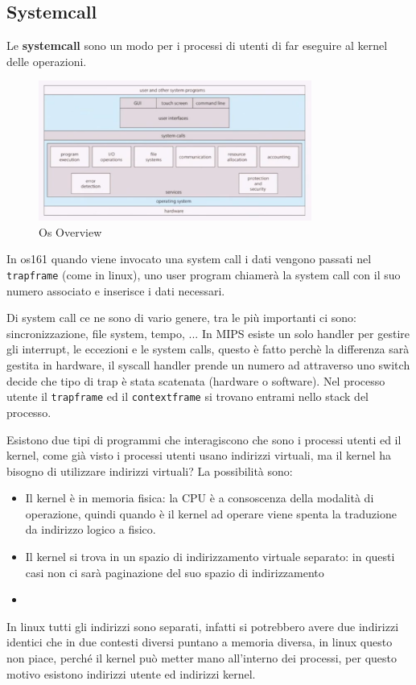 \documentclass[12pt]{article}
\begin{document}
\subsection{Systemcall}
Le \textbf{systemcall} sono un modo per i processi di utenti di far eseguire al kernel delle operazioni.
\begin{figure}[H]
  \centering
  \includegraphics[width=0.8\textwidth]{os-overview.png}
  \caption{Os Overview}
  \label{fig:os-overview}
\end{figure}
In os161 quando viene invocato una system call i dati vengono passati nel \texttt{trapframe} (come in linux), uno user program chiamer\`a la system call con il suo numero associato e inserisce i dati necessari.

Di system call ce ne sono di vario genere, tra le pi\`u importanti ci sono: sincronizzazione, file system, tempo, ... In MIPS esiste un solo handler per gestire gli interrupt, le eccezioni e le system calls, questo \`e fatto perch\`e la differenza sar\`a gestita in hardware, il syscall handler prende un numero ad attraverso uno switch decide che tipo di trap \`e stata scatenata (hardware o software). Nel processo utente il \texttt{trapframe} ed il \texttt{contextframe} si trovano entrami nello stack del processo.

Esistono due tipi di programmi che interagiscono che sono i processi utenti ed il kernel, come gi\`a visto i processi utenti usano indirizzi virtuali, ma il kernel ha bisogno di utilizzare indirizzi virtuali? La possibilit\`a sono:
\begin{itemize}
  \item Il kernel \`e in memoria fisica: la CPU \`e a consoscenza della modalit\`a di operazione, quindi quando \`e il kernel ad operare viene spenta la traduzione da indirizzo logico a fisico.
  \item Il kernel si trova in un spazio di indirizzamento virtuale separato: in questi casi non ci sar\`a paginazione del suo spazio di indirizzamento
  \item 
\end{itemize}
In linux tutti gli indirizzi sono separati, infatti si potrebbero avere due indirizzi identici che in due contesti diversi puntano a memoria diversa, in linux questo non piace, perch\'e il kernel pu\`o metter mano all'interno dei processi, per questo motivo esistono indirizzi utente ed indirizzi kernel.
\end{document}
